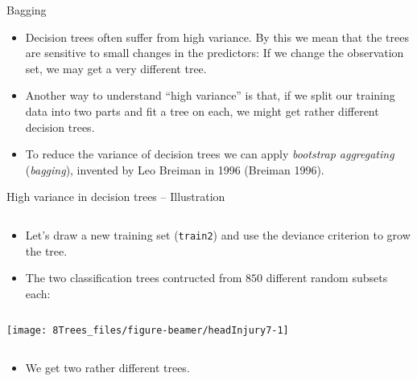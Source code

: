 \documentclass[10pt,ignorenonframetext,]{beamer}
\providecommand{\tightlist}{%
  \setlength{\itemsep}{0pt}\setlength{\parskip}{0pt}}
\begin{document}
\begin{frame}{Bagging}
\protect\hypertarget{bagging}{}

\vspace{2mm}

\begin{itemize}
\item
  Decision trees often suffer from high variance. By this we mean that
  the trees are sensitive to small changes in the predictors: If we
  change the observation set, we may get a very different tree.
\item
  Another way to understand ``high variance'' is that, if we split our
  training data into two parts and fit a tree on each, we might get
  rather different decision trees.
\end{itemize}

\begin{itemize}
\tightlist
\item
  To reduce the variance of decision trees we can apply \emph{bootstrap
  aggregating} (\emph{bagging}), invented by Leo Breiman in 1996
  (Breiman 1996).
\end{itemize}

\end{frame}

\begin{frame}[fragile]

\begin{block}{High variance in decision trees -- Illustration}

\(~\)

\begin{itemize}
\item
  Let's draw a new training set (\texttt{train2}) and use the deviance
  criterion to grow the tree.
\item
  The two classification trees contructed from \(850\) different random
  subsets each:
\end{itemize}

\(~\)

\begin{center}\texttt{[image: 8Trees\_files/figure-beamer/headInjury7-1]} \end{center}

\(~\)

\begin{itemize}
\tightlist
\item
  We get two rather different trees.
\end{itemize}

\vspace{2mm}

\end{block}

\end{frame}
\end{document}
